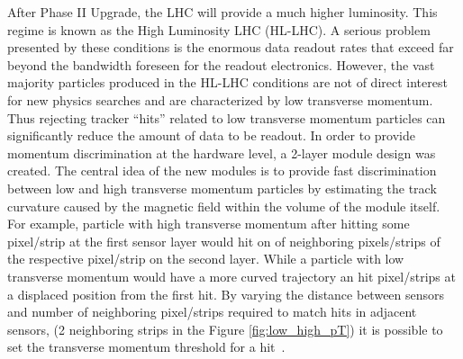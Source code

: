 After Phase II Upgrade, the LHC will provide a much higher luminosity. This regime is known as the High Luminosity LHC (HL-LHC). A serious problem presented by these conditions is the enormous data readout rates that exceed far beyond the bandwidth foreseen for the readout electronics.
However, the vast majority particles produced in the HL-LHC conditions are not of direct interest for new physics searches and are characterized by low transverse momentum. Thus rejecting tracker “hits” related to low transverse momentum particles can significantly reduce the amount of data to be readout. In order to provide momentum discrimination at the hardware level, a 2-layer module design was created. The central idea of the new modules is to provide fast discrimination between low and high transverse momentum particles by estimating the track curvature caused by the magnetic field within the volume of the module itself. For example, particle with high transverse momentum after hitting some pixel/strip at the first sensor layer would hit on of neighboring pixels/strips of the respective pixel/strip on the second layer. While a particle with low transverse momentum would have a more curved trajectory an hit pixel/strips at a displaced position from the first hit. By varying the distance between sensors and number of neighboring pixel/strips required to match hits in adjacent sensors, (2 neighboring strips in the Figure \ref{fig:low_high_pT}) it is possible to set the transverse momentum threshold for a hit~\cite{CMS_TECH_PHASE_II}.

